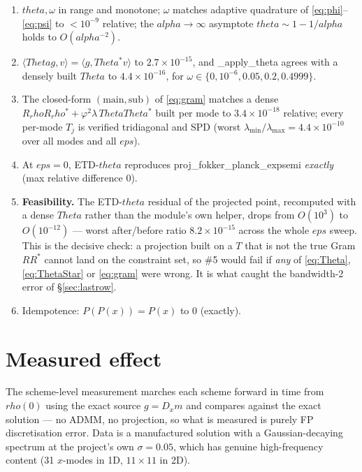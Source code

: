 \documentclass[11pt]{article}
\newcommand{\eps}{\varepsilon}
\newcommand{\dt}{\Delta t}
\newcommand{\dx}{\Delta x}
\newcommand{\code}[1]{\texttt{#1}}
\def\theta{theta}\def\Theta{Theta}\def\alpha{alpha}\def\rho{rho}%
\def\eps{eps}\def\dt{dt}\def\dx{dx}\def\code#1{#1}%
\begin{document}
\begin{enumerate}
  \item $\theta,\omega$ in range and monotone; $\omega$ matches adaptive quadrature of
        \eqref{eq:phi}--\eqref{eq:psi} to $<10^{-9}$ relative; the $\alpha\to\infty$
        asymptote $\theta\sim1-1/\alpha$ holds to $O(\alpha^{-2})$.
  \item $\langle\Theta g,v\rangle=\langle g,\Theta^*v\rangle$ to $2.7\times10^{-15}$, and
        \code{\_apply\_theta} agrees with a densely built $\Theta$ to
        $4.4\times10^{-16}$, for $\omega\in\{0,10^{-6},0.05,0.2,0.4999\}$.
  \item The closed-form $(\mathrm{main},\mathrm{sub})$ of \eqref{eq:gram} matches a dense
        $R_\rho R_\rho^*+\varphi^2\lambda\,\Theta\Theta^*$ built per mode to
        $3.4\times10^{-18}$ relative; every per-mode $T_j$ is verified tridiagonal and
        SPD (worst $\lambda_{\min}/\lambda_{\max}=4.4\times10^{-10}$ over all modes and
        all $\eps$).
  \item At $\eps=0$, ETD-$\theta$ reproduces \code{proj\_fokker\_planck\_expsemi}
        \emph{exactly} (max relative difference $0$).
  \item \textbf{Feasibility.} The ETD-$\theta$ residual of the projected point, recomputed
        with a dense $\Theta$ rather than the module's own helper, drops from
        $O(10^3)$ to $O(10^{-12})$ --- worst after/before ratio $8.2\times10^{-15}$
        across the whole $\eps$ sweep. This is the decisive check: a projection built on
        a $T$ that is not the true Gram $RR^*$ cannot land on the constraint set, so
        \#5 would fail if \emph{any} of \eqref{eq:Theta}, \eqref{eq:ThetaStar} or
        \eqref{eq:gram} were wrong. It is what caught the bandwidth-2 error of
        \S\ref{sec:lastrow}.
  \item Idempotence: $P(P(x))=P(x)$ to $0$ (exactly).
\end{enumerate}

\section{Measured effect}

The scheme-level measurement marches each scheme forward in time from $\rho(0)$ using the
exact source $g=D_xm$ and compares against the exact solution --- no ADMM, no projection,
so what is measured is purely FP discretisation error. Data is a manufactured solution
with a Gaussian-decaying spectrum at the project's own $\sigma=0.05$, which has genuine
high-frequency content (31 $x$-modes in 1D, $11\times11$ in 2D).
\end{document}
